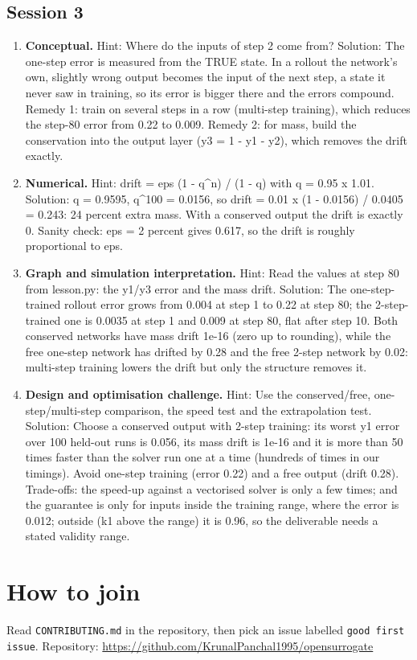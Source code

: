 \documentclass[11pt,a4paper]{article}
\begin{document}
\subsection*{Session 3}
\begin{enumerate}[nosep]
\item \textbf{Conceptual.} Hint: Where do the inputs of step 2 come from? Solution: The one-step error is measured from the TRUE state. In a rollout the network's own, slightly wrong output becomes the input of the next step, a state it never saw in training, so its error is bigger there and the errors compound. Remedy 1: train on several steps in a row (multi-step training), which reduces the step-80 error from 0.22 to 0.009. Remedy 2: for mass, build the conservation into the output layer (y3 = 1 - y1 - y2), which removes the drift exactly.
\item \textbf{Numerical.} Hint: drift = eps (1 - q\textasciicircum{}n) / (1 - q) with q = 0.95 x 1.01. Solution: q = 0.9595, q\textasciicircum{}100 = 0.0156, so drift = 0.01 x (1 - 0.0156) / 0.0405 = 0.243: 24 percent extra mass. With a conserved output the drift is exactly 0. Sanity check: eps = 2 percent gives 0.617, so the drift is roughly proportional to eps.
\item \textbf{Graph and simulation interpretation.} Hint: Read the values at step 80 from lesson.py: the y1/y3 error and the mass drift. Solution: The one-step-trained rollout error grows from 0.004 at step 1 to 0.22 at step 80; the 2-step-trained one is 0.0035 at step 1 and 0.009 at step 80, flat after step 10. Both conserved networks have mass drift 1e-16 (zero up to rounding), while the free one-step network has drifted by 0.28 and the free 2-step network by 0.02: multi-step training lowers the drift but only the structure removes it.
\item \textbf{Design and optimisation challenge.} Hint: Use the conserved/free, one-step/multi-step comparison, the speed test and the extrapolation test. Solution: Choose a conserved output with 2-step training: its worst y1 error over 100 held-out runs is 0.056, its mass drift is 1e-16 and it is more than 50 times faster than the solver run one at a time (hundreds of times in our timings). Avoid one-step training (error 0.22) and a free output (drift 0.28). Trade-offs: the speed-up against a vectorised solver is only a few times; and the guarantee is only for inputs inside the training range, where the error is 0.012; outside (k1 above the range) it is 0.96, so the deliverable needs a stated validity range.
\end{enumerate}

\section{How to join}
Read \texttt{CONTRIBUTING.md} in the repository, then pick an issue labelled \texttt{good first issue}. Repository: \url{https://github.com/KrunalPanchal1995/opensurrogate}
\end{document}
